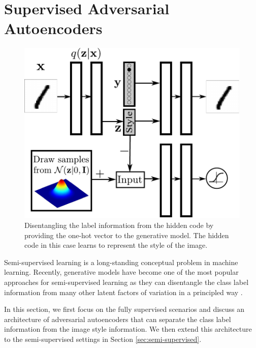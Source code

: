 \documentclass{article}
\begin{document}
\section{Supervised Adversarial Autoencoders}\label{sec:supervised}
\begin{figure}[t]
\begin{center}
\centering 
\hspace{0.2cm}\includegraphics[scale=.35]{adv_ae_style}
\caption{\label{fig_semi_adv}Disentangling the label information from the hidden code by providing the one-hot vector to the generative model. The hidden code in this case learns to represent the style of the image.}
\end{center}
\end{figure}
Semi-supervised learning is a long-standing conceptual problem in machine learning. Recently, generative models have become one of the most popular approaches for semi-supervised learning as they can disentangle the class label information from many other latent factors of variation in a principled way \citep{semi-vae,adgm}. 


In this section, we first focus on the fully supervised scenarios and discuss an architecture of adversarial autoencoders that can separate the class label information from the image style information. We then extend this architecture to the semi-supervised settings in Section \ref{sec:semi-supervised}.
\end{document}
